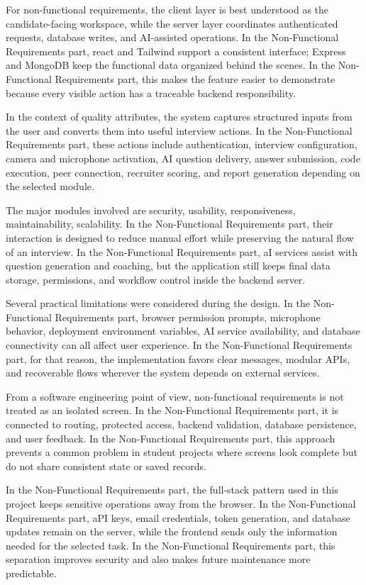 \documentclass[12pt,a4paper]{report}
\begin{document}
For non-functional requirements, the client layer is best understood as the candidate-facing workspace, while the server layer coordinates authenticated requests, database writes, and AI-assisted operations. In the Non-Functional Requirements part, react and Tailwind support a consistent interface; Express and MongoDB keep the functional data organized behind the scenes. In the Non-Functional Requirements part, this makes the feature easier to demonstrate because every visible action has a traceable backend responsibility.


In the context of quality attributes, the system captures structured inputs from the user and converts them into useful interview actions. In the Non-Functional Requirements part, these actions include authentication, interview configuration, camera and microphone activation, AI question delivery, answer submission, code execution, peer connection, recruiter scoring, and report generation depending on the selected module.


The major modules involved are security, usability, responsiveness, maintainability, scalability. In the Non-Functional Requirements part, their interaction is designed to reduce manual effort while preserving the natural flow of an interview. In the Non-Functional Requirements part, aI services assist with question generation and coaching, but the application still keeps final data storage, permissions, and workflow control inside the backend server.


Several practical limitations were considered during the design. In the Non-Functional Requirements part, browser permission prompts, microphone behavior, deployment environment variables, AI service availability, and database connectivity can all affect user experience. In the Non-Functional Requirements part, for that reason, the implementation favors clear messages, modular APIs, and recoverable flows wherever the system depends on external services.


From a software engineering point of view, non-functional requirements is not treated as an isolated screen. In the Non-Functional Requirements part, it is connected to routing, protected access, backend validation, database persistence, and user feedback. In the Non-Functional Requirements part, this approach prevents a common problem in student projects where screens look complete but do not share consistent state or saved records.


In the Non-Functional Requirements part, the full-stack pattern used in this project keeps sensitive operations away from the browser. In the Non-Functional Requirements part, aPI keys, email credentials, token generation, and database updates remain on the server, while the frontend sends only the information needed for the selected task. In the Non-Functional Requirements part, this separation improves security and also makes future maintenance more predictable.
\end{document}
